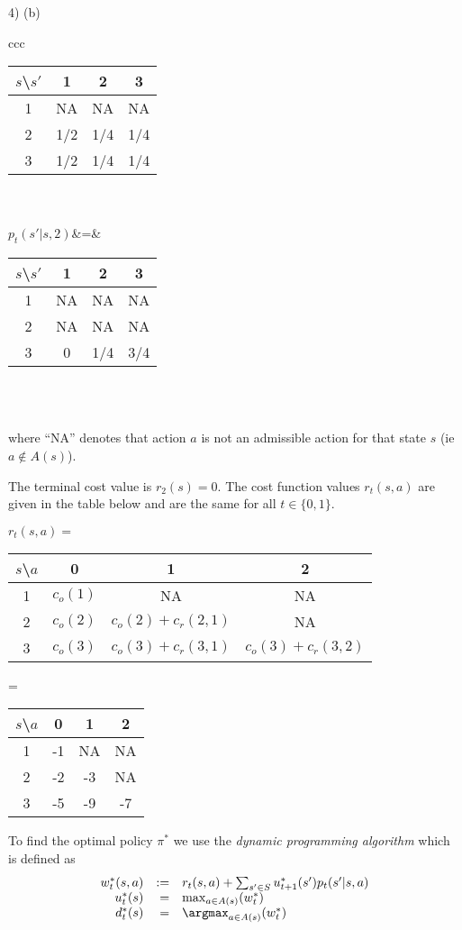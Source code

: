 \documentclass[11pt,a4paper]{article}
\begin{document}
\begin{answer}{4) (b)}
\begin{center}
\begin{tabular}{ccc}
\begin{tabular}{c|ccc}
      $s$\textbackslash $s'$&1&2&3\\\hline
      1&NA&NA&NA\\
      2&1/2&1/4&1/4\\
      3&1/2&1/4&1/4
      \end{tabular}\\\\
      $p_t(s'|s,2)$&=&\begin{tabular}{c|ccc}
      $s$\textbackslash $s'$&1&2&3\\\hline
      1&NA&NA&NA\\
      2&NA&NA&NA\\
      3&0&1/4&3/4
      \end{tabular}\\\\
    \end{tabular}
  \end{center}
  where ``NA'' denotes that action $a$ is not an admissible action for that state $s$ (ie $a\not\in A(s)$).
  \par The terminal cost value is $r_2(s)=0$. The cost function values $r_t(s,a)$ are given in the table below and are the same for all $t\in\{0,1\}$.
  \begin{center}
    $r_t(s,a)=$
    \begin{tabular}{c|ccc}
      $s$\textbackslash $a$&0&1&2\\\hline
      1&$c_o(1)$&NA&NA\\
      2&$c_o(2)$&$c_o(2)+c_r(2,1)$&NA\\
      3&$c_o(3)$&$c_o(3)+c_r(3,1)$&$c_o(3)+c_r(3,2)$\\
    \end{tabular}
    =
    \begin{tabular}{c|ccc}
      $s$\textbackslash $a$&0&1&2\\\hline
      1&-1&NA&NA\\
      2&-2&-3&NA\\
      3&-5&-9&-7
    \end{tabular}
  \end{center}
  To find the optimal policy $\pi^*$ we use the \textit{dynamic programming algorithm} which is defined as
  \[\begin{array}{rrl}
    w_t^*(s,a)&:=&r_t(s,a)+\sum_{s'\in S}u_{t+1}^*(s')p_t(s'|s,a)\\
    u_t^*(s)&=&\max_{a\in A(s)}(w_t^*)\\
    d_t^*(s)&=&\argmax_{a\in A(s)}(w_t^*)
  \end{array}\]

\end{answer}
\end{document}
